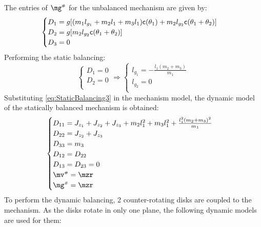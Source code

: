 \documentclass[a4paper,11pt,brazil,fleqn]{article}
\begin{document}
The entries of $\mg\ssh$ for the unbalanced mechanism are given by:
\begin{equation}\label{eq:gh3}
\begin{cases}
D_1 = g[ (m_1 l_{g_1} + m_2 l_1 + m_3 l_1 ) \mathsf{c}(\theta_1) + m_2 l_{g_2} \mathsf{c}(\theta_1+\theta_2) ] \\
D_2 = g[ m_2 l_{g_2} \mathsf{c}(\theta_1+\theta_2)  ] \\
D_3 = 0 \\
\end{cases}
\end{equation} 
Performing the static balancing:
\begin{equation}\label{eq:StaticBalancing3}
\begin{cases}
D_1 = 0 \\
D_2 = 0 \\
\end{cases}
\Rightarrow
\begin{cases}
l_{g_1} = -\frac{l_1 (m_2+m_3)}{m_1} \\
l_{g_2} = 0 \\
\end{cases}
\end{equation}
Substituting \eqref{eq:StaticBalancing3} in the mechanism model, the dynamic model of the statically balanced mechanism is obtained:
\begin{equation}\label{eq:StaticBalanced3}
\begin{cases}
D_{11} = J_{z_1} + J_{z_2} + J_{z_3} + m_2 l_1^2 + m_3 l_1^2 + \frac{l_1^2 (m_2 + m_3)^2}{m_1} \\
D_{22} = J_{z_2} + J_{z_3} \\
D_{33} = m_3 \\
D_{12} = D_{22} \\
D_{13} = D_{23} = 0 \\
\mv\ssh = \mzr \\
\mg\ssh = \mzr
\end{cases}
\end{equation}
To perform the dynamic balancing, 2 counter-rotating disks are coupled to the mechanism. As the disks rotate in only one plane, the following dynamic models are used for them:
\end{document}
